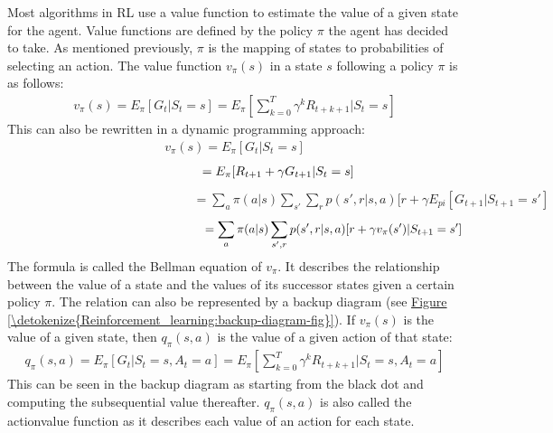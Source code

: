 \documentclass[letterpaper,10pt,english]{jupyterBook}
\begin{document}
\sphinxAtStartPar
Most algorithms in RL use a value function to estimate the value of a given state for the agent. Value functions are defined by the policy \(\pi\) the agent has decided to take. As mentioned previously, \(\pi\) is the mapping of states to probabilities of selecting an action. The value function \(v_{\pi}(s)\) in a state \(s\) following a policy \(\pi\) is as follows:
\begin{equation}\label{equation:Reinforcement_learning:value}
\begin{split}v_{\pi}(s) = E_{\pi}[G_t | S_t = s] = E_{\pi}[\sum_{k=0}^T \gamma^kR_{t+k+1} | S_t=s]\end{split}
\end{equation}
\sphinxAtStartPar
This can also be rewritten in a dynamic programming approach:
\begin{equation*}
\begin{split}v_{\pi}(s) = E_{\pi}[G_t | S_t = s] \end{split}
\end{equation*}\begin{equation*}
\begin{split} \hspace{2.4cm}= E_{\pi}[R_{t+1} + \gamma G_{t+1} | S_t = s] \end{split}
\end{equation*}\begin{equation*}
\begin{split}  \hspace{6cm} = \sum_a \pi(a|s) \sum_{s'} \sum_r p(s', r|s,a)[r + \gamma E_{pi}[G_{t+1} | S_{t+1} = s'] \end{split}
\end{equation*}\begin{equation}\label{equation:Reinforcement_learning:BELL}
\begin{split}\hspace{5.8cm}= \sum_a \pi(a|s) \sum_{s', r}p(s', r|s,a)[r + \gamma v_{\pi}(s')| S_{t+1} = s'] \end{split}
\end{equation}
\sphinxAtStartPar
The formula is called the Bellman equation of \(v_{\pi}\). It describes the relationship between the value of a state and the values of its successor states given a certain policy \(\pi\). The relation can also be represented by a backup diagram (see \hyperref[\detokenize{Reinforcement_learning:backup-diagram-fig}]{Figure \ref{\detokenize{Reinforcement_learning:backup-diagram-fig}}}). If \(v_{\pi}(s)\) is the value of a given state, then \(q_{\pi}(s,a)\) is the value of a given action of that state:
\begin{equation}\label{equation:Reinforcement_learning:state-action}
\begin{split} q_{\pi}(s,a) = E_{\pi}[G_t | S_t = s, A_t = a] = E_{\pi}[\sum_{k=0}^T \gamma^kR_{t+k+1} | S_t=s, A_t = a] \end{split}
\end{equation}
\sphinxAtStartPar
This can be seen in the backup diagram as starting from the black dot and computing the subsequential value thereafter. \(q_{\pi}(s,a)\) is also called the action\sphinxhyphen{}value function as it describes each value of an action for each state.
\end{document}
